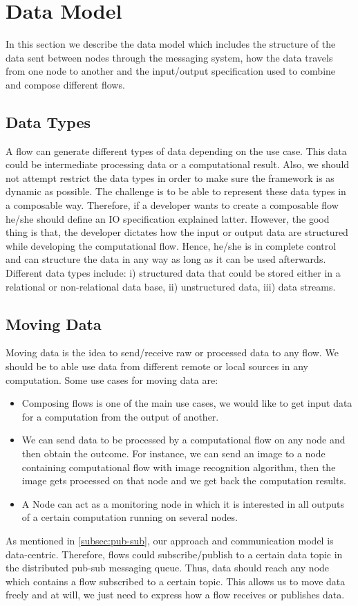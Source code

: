 \section{Data Model}
In this section we describe the data model which includes the structure of the data sent between nodes through the messaging system, how the data travels from one node to another and the input/output specification used to combine and compose different flows.

\subsection{Data Types}
A flow can generate different types of data depending on the use case. This data could be intermediate processing data or a computational result. Also, we should not attempt restrict the data types in order to make sure the framework is as dynamic as possible. The challenge is to be able to represent these data types in a composable way. Therefore, if a developer wants to create a composable flow he/she should define an IO specification explained latter. However, the good thing is that, the developer dictates how the input or output data are structured while developing the computational flow. Hence, he/she is in complete control and can structure the data in any way as long as it can be used afterwards.  Different data types include: i) structured data that could be stored either in a relational or non-relational data base, ii) unstructured data, iii)  data streams.

\subsection{Moving Data}

Moving data is the idea  to send/receive raw or processed data to any flow. We should be to able use data from different remote or local sources in any computation. Some use cases for moving data are:
\begin{itemize}
\item Composing flows is one of the main use cases, we would like to get input data for a computation from the output of another.

\item We can send data to be processed by a computational flow on any node and then obtain the outcome. For instance, we can send an image to a node containing computational flow with image recognition algorithm, then the image gets processed on that node and we get back the computation results. 

\item A Node can act as a monitoring node in which it is interested in all outputs of a certain computation running on several nodes.

\end{itemize} 
 As mentioned in \ref{subsec:pub-sub}, our approach and communication model is data-centric. Therefore, flows could subscribe/publish to a certain data topic in the distributed pub-sub messaging queue. Thus, data should reach any node which contains a flow subscribed to a certain topic. This allows us to move data freely and at will, we just need to express how a flow receives or publishes data.

